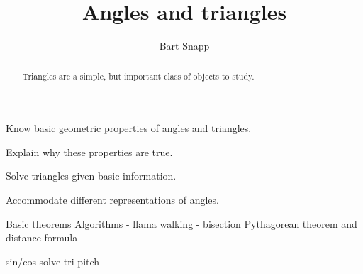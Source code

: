 \documentclass[handout,nooutcomes,noauthor]{../ximera}
\title{Angles and triangles}
\author{Bart Snapp}
\begin{document}
\begin{abstract}
  Triangles are a simple, but important class of objects to study.
\end{abstract}
\maketitle


\begin{listSectionOutcomes}
\item Know basic geometric properties of angles and triangles.
\item Explain why these properties are true.
\item Solve triangles given basic information.
\item Accommodate different representations of angles.
\end{listSectionOutcomes}


Basic theorems
Algorithms
- llama walking
- bisection
Pythagorean theorem and distance formula

sin/cos
solve tri
pitch
\end{document}
